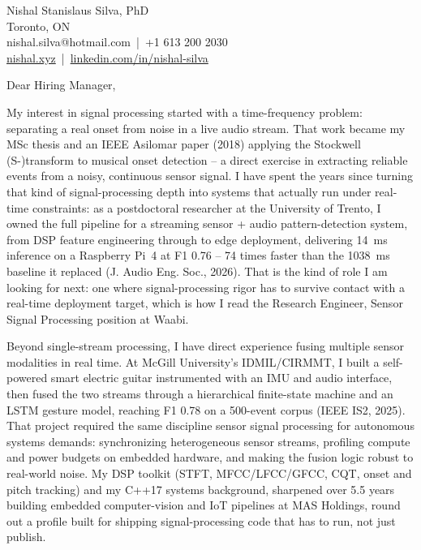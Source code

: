 \documentclass[11pt]{article}
\begin{document}
\pagestyle{empty}

\begin{flushleft}
Nishal Stanislaus Silva, PhD \\
Toronto, ON \\
nishal.silva@hotmail.com \,|\, +1 613 200 2030 \\
\href{https://nishal.xyz}{nishal.xyz} \,|\, \href{https://www.linkedin.com/in/nishal-silva}{linkedin.com/in/nishal-silva}
\end{flushleft}

\vspace{1em}

Dear Hiring Manager,

\vspace{0.5em}

My interest in signal processing started with a time-frequency problem: separating a real onset from noise in a live audio stream. That work became my MSc thesis and an IEEE Asilomar paper (2018) applying the Stockwell (S-)transform to musical onset detection -- a direct exercise in extracting reliable events from a noisy, continuous sensor signal. I have spent the years since turning that kind of signal-processing depth into systems that actually run under real-time constraints: as a postdoctoral researcher at the University of Trento, I owned the full pipeline for a streaming sensor + audio pattern-detection system, from DSP feature engineering through to edge deployment, delivering 14~ms inference on a Raspberry Pi~4 at F1 0.76 -- 74 times faster than the 1038~ms baseline it replaced (J. Audio Eng. Soc., 2026). That is the kind of role I am looking for next: one where signal-processing rigor has to survive contact with a real-time deployment target, which is how I read the Research Engineer, Sensor Signal Processing position at Waabi.

\vspace{0.5em}

Beyond single-stream processing, I have direct experience fusing multiple sensor modalities in real time. At McGill University's IDMIL/CIRMMT, I built a self-powered smart electric guitar instrumented with an IMU and audio interface, then fused the two streams through a hierarchical finite-state machine and an LSTM gesture model, reaching F1 0.78 on a 500-event corpus (IEEE IS2, 2025). That project required the same discipline sensor signal processing for autonomous systems demands: synchronizing heterogeneous sensor streams, profiling compute and power budgets on embedded hardware, and making the fusion logic robust to real-world noise. My DSP toolkit (STFT, MFCC/LFCC/GFCC, CQT, onset and pitch tracking) and my C++17 systems background, sharpened over 5.5 years building embedded computer-vision and IoT pipelines at MAS Holdings, round out a profile built for shipping signal-processing code that has to run, not just publish.
\end{document}

